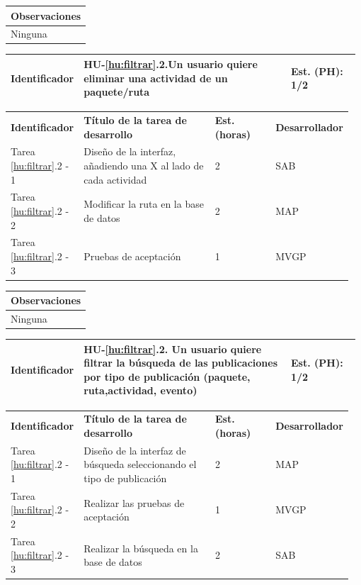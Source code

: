 \documentclass[11pt]{article}
\begin{document}
\begin{longtable}{p{1.028\linewidth}}
	\textbf{Observaciones}\\
	\midrule
	Ninguna\\
	\bottomrule
	\bottomrule
\end{longtable}

\centering
\begin{longtable}{p{0.18\linewidth}|p{0.6\linewidth}|p{0.2\linewidth}}
	\toprule
	\toprule
	\textbf{Identificador} & \textbf{HU-\ref{hu:filtrar}.2}.Un usuario quiere eliminar una actividad de un paquete/ruta & \textbf{Est. (PH):} 1/2 \\
	
	\bottomrule
\end{longtable}

\begin{longtable}{p{0.18\linewidth}|p{0.4\linewidth}|p{0.18\linewidth}|p{0.2\linewidth}}
	\toprule
	\textbf{Identificador} & \textbf{Título de la tarea de desarrollo} & \textbf{Est. (horas)} & \textbf{Desarrollador} \\
        Tarea \ref{hu:filtrar}.2 - 1 & Diseño de la interfaz, añadiendo una X al lado de cada actividad & 2 & SAB\\
        Tarea \ref{hu:filtrar}.2 - 2 & Modificar la ruta en la base de datos & 2 & MAP\\
        Tarea \ref{hu:filtrar}.2 - 3 & Pruebas de aceptación & 1 & MVGP\\
	\bottomrule
\end{longtable}

\begin{longtable}{p{1.028\linewidth}}
	\textbf{Observaciones}\\
	\midrule
	Ninguna\\
	\bottomrule
	\bottomrule
\end{longtable}

\centering
\begin{longtable}{p{0.18\linewidth}|p{0.6\linewidth}|p{0.2\linewidth}}
	\toprule
	\toprule
	\textbf{Identificador} & \textbf{HU-\ref{hu:filtrar}.2}. Un usuario quiere filtrar la búsqueda de las publicaciones por tipo de publicación (paquete, ruta,actividad, evento) & \textbf{Est. (PH):} 1/2 \\
	
	\bottomrule
\end{longtable}

\begin{longtable}{p{0.18\linewidth}|p{0.4\linewidth}|p{0.18\linewidth}|p{0.2\linewidth}}
	\toprule
	\textbf{Identificador} & \textbf{Título de la tarea de desarrollo} & \textbf{Est. (horas)} & \textbf{Desarrollador} \\
        Tarea \ref{hu:filtrar}.2 - 1 & Diseño de la interfaz de búsqueda seleccionando el tipo de publicación & 2 & MAP\\
        Tarea \ref{hu:filtrar}.2 - 2 & Realizar las pruebas de aceptación & 1 & MVGP\\
        Tarea \ref{hu:filtrar}.2 - 3 & Realizar la búsqueda en la base de datos & 2 & SAB \\
	\bottomrule
\end{longtable}
\end{document}
